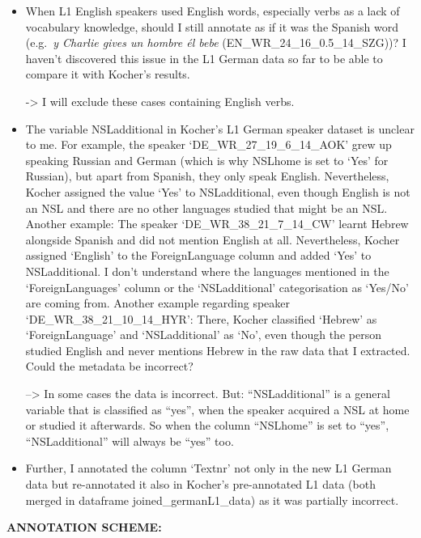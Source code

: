 \documentclass[
  letterpaper,
  DIV=11,
  numbers=noendperiod]{scrartcl}
\begin{document}
\begin{itemize}
\item
  When L1 English speakers used English words, especially verbs as a
  lack of vocabulary knowledge, should I still annotate as if it was the
  Spanish word (e.g.~\emph{y Charlie gives un hombre él bebe}
  (EN\_WR\_24\_16\_0.5\_14\_SZG))? I haven't discovered this issue in
  the L1 German data so far to be able to compare it with Kocher's
  results.

  -\textgreater{} I will exclude these cases containing English verbs.
\item
  The variable NSLadditional in Kocher's L1 German speaker dataset is
  unclear to me. For example, the speaker `DE\_WR\_27\_19\_6\_14\_AOK'
  grew up speaking Russian and German (which is why NSLhome is set to
  `Yes' for Russian), but apart from Spanish, they only speak English.
  Nevertheless, Kocher assigned the value `Yes' to NSLadditional, even
  though English is not an NSL and there are no other languages studied
  that might be an NSL. Another example: The speaker
  `DE\_WR\_38\_21\_7\_14\_CW' learnt Hebrew alongside Spanish and did
  not mention English at all. Nevertheless, Kocher assigned `English' to
  the ForeignLanguage column and added `Yes' to NSLadditional. I don't
  understand where the languages mentioned in the `ForeignLanguages'
  column or the `NSLadditional' categorisation as `Yes/No' are coming
  from. Another example regarding speaker `DE\_WR\_38\_21\_10\_14\_HYR':
  There, Kocher classified `Hebrew' as `ForeignLanguage' and
  `NSLadditional' as `No', even though the person studied English and
  never mentions Hebrew in the raw data that I extracted. Could the
  metadata be incorrect?

  --\textgreater{} In some cases the data is incorrect. But:
  ``NSLadditional'' is a general variable that is classified as ``yes'',
  when the speaker acquired a NSL at home or studied it afterwards. So
  when the column ``NSLhome'' is set to ``yes'', ``NSLadditional'' will
  always be ``yes'' too.
\item
  Further, I annotated the column `Textnr' not only in the new L1 German
  data but re-annotated it also in Kocher's pre-annotated L1 data (both
  merged in dataframe joined\_germanL1\_data) as it was partially
  incorrect.
\end{itemize}

\textbf{ANNOTATION SCHEME:}
\end{document}
